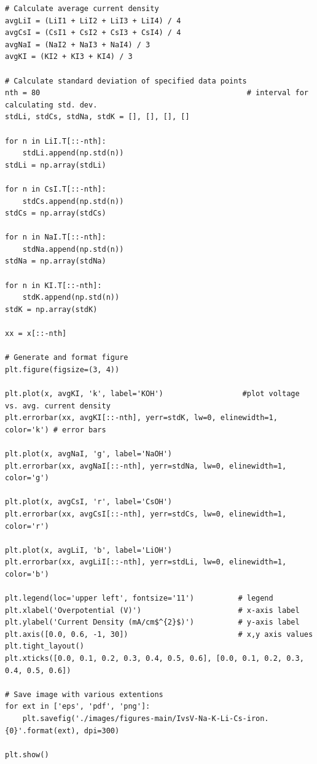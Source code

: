 \documentclass[journal=jpccck,manuscript=suppinfo,email=true]{achemso}
\begin{document}
\begin{verbatim}
# Calculate average current density
avgLiI = (LiI1 + LiI2 + LiI3 + LiI4) / 4
avgCsI = (CsI1 + CsI2 + CsI3 + CsI4) / 4
avgNaI = (NaI2 + NaI3 + NaI4) / 3
avgKI = (KI2 + KI3 + KI4) / 3

# Calculate standard deviation of specified data points
nth = 80                                               # interval for calculating std. dev.
stdLi, stdCs, stdNa, stdK = [], [], [], []

for n in LiI.T[::-nth]:
    stdLi.append(np.std(n))
stdLi = np.array(stdLi)

for n in CsI.T[::-nth]:
    stdCs.append(np.std(n))
stdCs = np.array(stdCs)

for n in NaI.T[::-nth]:
    stdNa.append(np.std(n))
stdNa = np.array(stdNa)

for n in KI.T[::-nth]:
    stdK.append(np.std(n))
stdK = np.array(stdK)

xx = x[::-nth]

# Generate and format figure
plt.figure(figsize=(3, 4))

plt.plot(x, avgKI, 'k', label='KOH')                  #plot voltage vs. avg. current density
plt.errorbar(xx, avgKI[::-nth], yerr=stdK, lw=0, elinewidth=1, color='k') # error bars

plt.plot(x, avgNaI, 'g', label='NaOH')
plt.errorbar(xx, avgNaI[::-nth], yerr=stdNa, lw=0, elinewidth=1, color='g')

plt.plot(x, avgCsI, 'r', label='CsOH')
plt.errorbar(xx, avgCsI[::-nth], yerr=stdCs, lw=0, elinewidth=1, color='r')

plt.plot(x, avgLiI, 'b', label='LiOH')
plt.errorbar(xx, avgLiI[::-nth], yerr=stdLi, lw=0, elinewidth=1, color='b')

plt.legend(loc='upper left', fontsize='11')          # legend
plt.xlabel('Overpotential (V)')                      # x-axis label
plt.ylabel('Current Density (mA/cm$^{2}$)')          # y-axis label
plt.axis([0.0, 0.6, -1, 30])                         # x,y axis values
plt.tight_layout()
plt.xticks([0.0, 0.1, 0.2, 0.3, 0.4, 0.5, 0.6], [0.0, 0.1, 0.2, 0.3, 0.4, 0.5, 0.6])

# Save image with various extentions
for ext in ['eps', 'pdf', 'png']:
    plt.savefig('./images/figures-main/IvsV-Na-K-Li-Cs-iron.{0}'.format(ext), dpi=300)

plt.show()
\end{verbatim}
\end{document}
